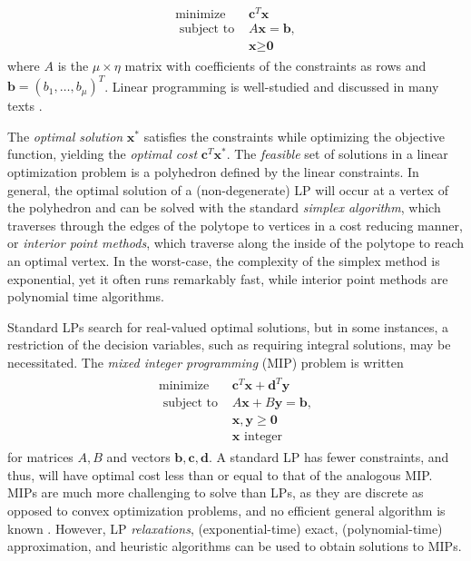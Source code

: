\documentclass[11pt,onecolumn]{article}
\theoremstyle{plain}
\theoremstyle{definition}
\begin{document}
\begin{align}
   \begin{split}
    \text{minimize } & \textbf{c}^T\textbf{x} \\
    \text{ subject to } & A\textbf{x}=\textbf{b}, \\
    & \textbf{x} \geq \textbf{0}
   \end{split}
   \label{eq:linearprogram}
\end{align}
where $A$ is the $\mu \times \eta$ matrix with coefficients of the constraints as rows and $\textbf{b}=(b_1,\ldots,b_\mu)^T$. Linear programming is well-studied and discussed in many texts \cite{bertsimas-LPbook, Vanderbei-LPbook,BoyVan2004}.

The \emph{optimal solution} $\textbf{x}^*$ satisfies the constraints while optimizing the objective function, yielding the \emph{optimal cost} $\textbf{c}^T\textbf{x}^*$. The \emph{feasible} set of solutions in a linear optimization problem is a polyhedron defined by the linear constraints. In general, the optimal solution of a (non-degenerate) LP will occur at a vertex of the polyhedron and can be solved with the standard \emph{simplex algorithm}, which traverses through the edges of the polytope to vertices in a cost reducing manner, or \emph{interior point methods}, which traverse along the inside of the polytope to reach an optimal vertex. In the worst-case, the complexity of the simplex method is exponential, yet it often runs remarkably fast, while interior point methods are polynomial time algorithms.

Standard LPs search for real-valued optimal solutions, but in some instances, a restriction of the decision variables, such as requiring integral solutions, may be necessitated. The \emph{mixed integer programming} (MIP) problem is written
\begin{align}
   \begin{split}
    \text{minimize } & \textbf{c}^T\textbf{x} +\textbf{d}^T\textbf{y}\\
    \text{ subject to } & A\textbf{x} + B \textbf{y}=\textbf{b}, \\
    & \textbf{x}, \textbf{y} \geq \textbf{0}\\
    & \textbf{x} \text{ integer}
   \end{split}
   \label{eq:linearprogram}
\end{align}
for matrices $A,B$ and vectors $\textbf{b},\textbf{c},\textbf{d}$. A standard LP has fewer constraints, and thus, will have optimal cost less than or equal to that of the analogous MIP. MIPs are much more challenging to solve than LPs, as they are discrete as opposed to convex optimization problems, and no efficient general algorithm is known \cite{bertsimas-LPbook}. However, LP \emph{relaxations}, (exponential-time) exact, (polynomial-time)  approximation, and heuristic algorithms can be used to obtain solutions to MIPs. 
\end{document}
